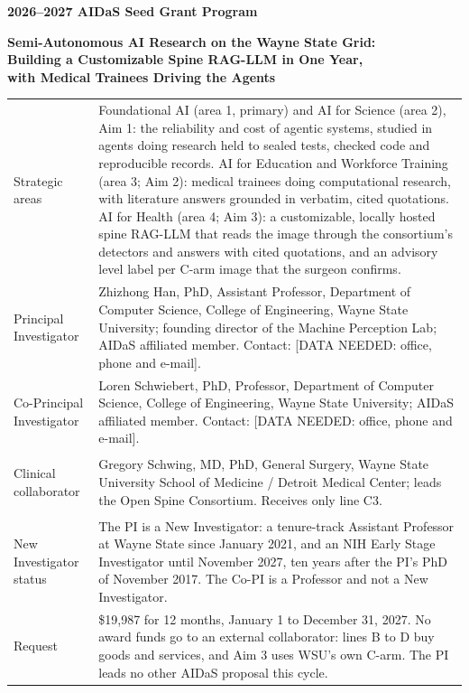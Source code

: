 \documentclass[10pt,letterpaper]{article}
\newcommand{\tbd}[1]{{\color{tbdred}[DATA NEEDED: #1]}}
\providecommand{\HanContact}{Contact: \tbd{office, phone and e-mail}.}
\providecommand{\SchwiebertContact}{Contact: \tbd{office, phone and e-mail}.}
\begin{document}
\begin{center}
{\bfseries 2026--2027 AIDaS Seed Grant Program}\par\smallskip
{\Large\bfseries Semi-Autonomous AI Research on the Wayne State Grid:\\[1pt]
Building a Customizable Spine RAG-LLM in One Year,\\[1pt] with Medical Trainees Driving the Agents\par}
\end{center}
\vspace{4pt}

\begin{tabularx}{\linewidth}{@{}>{\bfseries\raggedright\arraybackslash}p{1.55in}X@{}}
Strategic areas & Foundational AI (area 1, primary) and AI for Science (area 2), Aim 1: the reliability and cost of
agentic systems, studied in agents doing research held to sealed tests, checked code and reproducible records. AI for
Education and Workforce Training
(area 3; Aim 2): medical trainees doing computational research, with literature answers grounded in verbatim, cited
quotations. AI for Health (area 4; Aim 3): a customizable, locally hosted spine RAG-LLM that reads the image through the
consortium's detectors and answers with cited quotations, and an advisory level label per C-arm image that the surgeon
confirms.\\[2pt]
Principal Investigator & Zhizhong Han, PhD, Assistant Professor, Department of Computer Science, College of
  Engineering, Wayne State University; founding director of the Machine Perception Lab; AIDaS affiliated member.
  \HanContact\\[2pt]
Co-Principal Investigator & Loren Schwiebert, PhD, Professor, Department of Computer Science, College of Engineering,
  Wayne State University; AIDaS affiliated member. \SchwiebertContact\\[2pt]
Clinical collaborator & Gregory Schwing, MD, PhD, General Surgery, Wayne State University School of Medicine /
  Detroit Medical Center; leads the Open Spine Consortium. Receives only line C3.\\[2pt]
New Investigator status & The PI is a New Investigator: a tenure-track Assistant Professor at Wayne State since January 2021,
  and an NIH Early Stage Investigator until November 2027, ten
  years after the PI's PhD of November 2017.
  The Co-PI is a Professor and
  not a New Investigator.\\[2pt]
Request & \$19,987 for 12 months, January 1 to December 31, 2027. No award funds go to an external collaborator:
  lines B to D buy goods and services, and Aim 3 uses WSU's own C-arm. The PI leads no other AIDaS
  proposal this cycle.\\
\end{tabularx}
\end{document}
